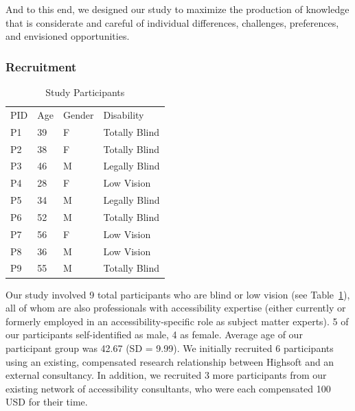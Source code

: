 \documentclass[12pt]{cmuthesis}
\begin{document}
And to this end, we designed our study to maximize the production of knowledge that is considerate and careful of individual differences, challenges, preferences, and envisioned opportunities.

\subsubsection{Recruitment}
\begin{table}
\caption{Study Participants}
\label{tab:participants}
\begin{tabular*}{18pc}{@{}llll@{}}
\toprule
PID & Age & Gender & Disability \\%
P1  & 39  & F      & Totally Blind \\%
P2  & 38  & F      & Totally Blind \\%
P3  & 46  & M      & Legally Blind \\%
P4  & 28  & F      & Low Vision \\%
P5  & 34  & M      & Legally Blind \\%
P6  & 52  & M      & Totally Blind \\%
P7  & 56  & F      & Low Vision \\%
P8  & 36  & M      & Low Vision \\%
P9  & 55  & M      & Totally Blind \\%
\end{tabular*}
\end{table}
Our study involved 9 total participants who are blind or low vision (see Table~\ref{tab:participants}), all of whom are also professionals with accessibility expertise (either currently or formerly employed in an accessibility-specific role as subject matter experts). 5 of our participants self-identified as male, 4 as female. Average age of our participant group was 42.67 (SD = 9.99). We initially recruited 6 participants using an existing, compensated research relationship between Highsoft and an external consultancy. In addition, we recruited 3 more participants from our existing network of accessibility consultants, who were each compensated 100 USD for their time.
\end{document}
